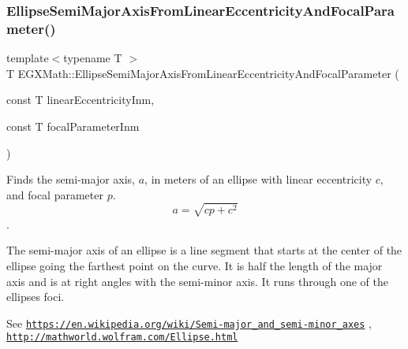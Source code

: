 \mbox{\label{group___e_g_x_math-_geometry-2_d-_ellipse-_semi_major_axis_gad77cbdb5c764cb11bc79a7373d0b6881}} 
\subsubsection{\texorpdfstring{Ellipse\+Semi\+Major\+Axis\+From\+Linear\+Eccentricity\+And\+Focal\+Parameter()}{EllipseSemiMajorAxisFromLinearEccentricityAndFocalParameter()}}
{\footnotesize\ttfamily template$<$typename T $>$ \\
T E\+G\+X\+Math\+::\+Ellipse\+Semi\+Major\+Axis\+From\+Linear\+Eccentricity\+And\+Focal\+Parameter (\begin{DoxyParamCaption}\item[{const T}]{linear\+Eccentricity\+Inm,  }\item[{const T}]{focal\+Parameter\+Inm }\end{DoxyParamCaption})}



Finds the semi-\/major axis, $a$, in meters of an ellipse with linear eccentricity $c$, and focal parameter $p$. \[ a=\sqrt{cp + c^2} \]. 

The semi-\/major axis of an ellipse is a line segment that starts at the center of the ellipse going the farthest point on the curve. It is half the length of the major axis and is at right angles with the semi-\/minor axis. It runs through one of the ellipses foci.

See \href{https://en.wikipedia.org/wiki/Semi-major_and_semi-minor_axes}{\tt https\+://en.\+wikipedia.\+org/wiki/\+Semi-\/major\+\_\+and\+\_\+semi-\/minor\+\_\+axes} , \href{http://mathworld.wolfram.com/Ellipse.html}{\tt http\+://mathworld.\+wolfram.\+com/\+Ellipse.\+html}


